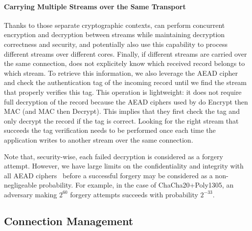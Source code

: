 \paragraph*{Carrying Multiple Streams over the Same Transport}
Thanks to those separate cryptographic contexts, \tcpls can perform concurrent
encryption and decryption between streams while maintaining decryption
correctness and security, and potentially also use this capability to process
different streams over different cores.
Finally, if different streams are carried
over the same \tcp connection, \tcpls does not explicitely know which
received record belongs to which stream. To retrieve this information,
we also
leverage the AEAD cipher and check the authentication tag of the incoming record
until we find the stream that properly verifies this tag. This operation is
lightweight: it does not require full decryption of the record because the AEAD
ciphers used by  do Encrypt then MAC (and MAC then Decrypt). This
implies that they first check the tag and only decrypt the record
if the tag is correct.
Looking for the right stream that succeeds the tag verification needs to be
performed once each time the application writes to another stream over the same
\tcp connection.

Note that, security-wise, each failed decryption is considered as a
forgery attempt. However, we have large limits on the confidentiality and
integrity with all AEAD ciphers~\cite{luykx2015limits, aeadlimits} before a
successful forgery may be considered as a non-negligeable probability. For
example, in the case of ChaCha20+Poly1305, an adversary making $2^{60}$ forgery
attempts succeeds with probability $2^{-33}$.



\subsection{Connection Management}\label{sec:multipath}

